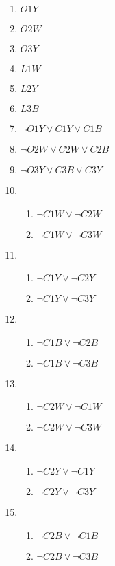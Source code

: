 \documentclass[22pt]{article}
\begin{document}
\begin{multicols}{2}
\begin{enumerate}
	\item $O1Y$
	\item $O2W$
	\item $O3Y$
	\item $L1W$
	\item $L2Y$
	\item $L3B$
	\item $\neg O1Y \lor C1Y \lor C1B$
	\item $\neg O2W \lor C2W \lor C2B$
	\item $\neg O3Y \lor C3B \lor C3Y$

	\item
	\begin{enumerate}
		\item $\neg C1W \lor \neg C2W$
		\item $\neg C1W \lor \neg C3W$
	\end{enumerate}

	\item
	\begin{enumerate}
		\item $\neg C1Y \lor \neg C2Y$
		\item $\neg C1Y \lor \neg C3Y$
	\end{enumerate}

	\item
	\begin{enumerate}

		\item $\neg C1B \lor \neg C2B$
		\item $\neg C1B \lor \neg C3B$
	\end{enumerate}

	\item
	\begin{enumerate}
		\item $\neg C2W \lor \neg C1W$
		\item $\neg C2W \lor \neg C3W$
	\end{enumerate}
	
	\item
	\begin{enumerate}
		\item $\neg C2Y \lor \neg C1Y$
		\item $\neg C2Y \lor \neg C3Y$
	\end{enumerate}

	\item
	\begin{enumerate}
		\item $\neg C2B \lor \neg C1B$
		\item $\neg C2B \lor \neg C3B$
	\end{enumerate}


\end{enumerate}
\end{multicols}
\end{document}
